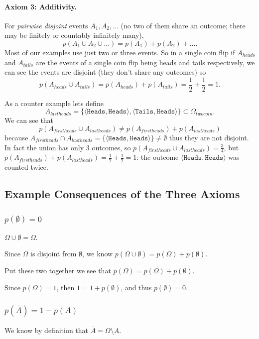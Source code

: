 \paragraph{Axiom 3: Additivity.}
For \textit{pairwise disjoint} events $A_1, A_2, ...$ (no two of them share an outcome; there may be finitely or countably infinitely many), \[p(A_1\cup A_2\cup ... )=p(A_1) + p(A_2) + ... .\]
Most of our examples use just two or three events.
So in a single coin flip if $A_{heads}$ and $A_{tails}$ are the events of a single coin flip being heads and tails respectively, 
we can see the events are disjoint (they don't share any outcomes)
so \[p(A_{heads} \cup A_{tails}) = p(A_{heads}) + p(A_{tails}) = \frac{1}{2} + \frac{1}{2} = 1.\]

As a counter example lets define \[A_{lastheads}=\{
\langle\texttt{Heads},\texttt{Heads}\rangle,
\langle\texttt{Tails},\texttt{Heads}\rangle\} \subset \Omega_{twocoin}. \]
We can see that 
\[p(A_{firstheads} \cup A_{lastheads}) \ne p(A_{firstheads}) + p(A_{lastheads})\]
because $A_{firstheads} \cap A_{lastheads} = \{\langle\texttt{Heads},\texttt{Heads}\rangle\} \ne \emptyset$ thus they are not disjoint.
In fact the union has only 3 outcomes, so $p(A_{firstheads} \cup A_{lastheads})=\frac{3}{4}$,
but $p(A_{firstheads}) + p(A_{lastheads}) = \frac{1}{2}+\frac{1}{2} = 1$:
the outcome $\langle\texttt{Heads},\texttt{Heads}\rangle$ was counted twice.


\subsection{Example Consequences of the Three Axioms}

\subsubsection{$p(\emptyset) = 0$}
$\Omega \cup \emptyset = \Omega$. 

Since $\Omega$ is disjoint from $\emptyset$, 
we know $p(\Omega\cup\emptyset) = p(\Omega) + p(\emptyset)$. 

Put these two together we see that 
$p(\Omega) = p(\Omega) + p(\emptyset)$. 

Since $p(\Omega)=1$, 
then $1 = 1 + p(\emptyset)$, 
and thus $p(\emptyset) = 0$. 

\subsubsection{$p(\overline{A}) = 1-p(A)$}
We know by definition that $\overline{A} = \Omega \setminus A$. 

